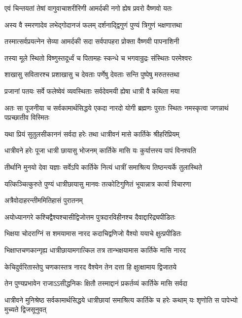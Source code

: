 \twolineshloka
{एवं चिन्तयतां तेषां वागुवाचाशरीरिणी}
{आमर्दकी नगो ह्येष प्रवरो वैष्णवो यतः} %

\twolineshloka
{अस्य वै स्मरणादेव लभेद्गोदानजं फलम्}
{दर्शनाद्द्विगुणं पुण्यं त्रिगुणं भक्षणात्तथा} %

\twolineshloka
{तस्मात्सर्वप्रयत्नेन सेव्या आमर्दकी सदा}
{सर्वपापहरा प्रोक्ता वैष्णवी पापनाशिनी} %

\twolineshloka
{तस्या मूले स्थितो विष्णुस्तदूर्ध्वं च पितामहः}
{स्कन्धे च भगवान्रुद्रः संस्थितः परमेश्वरः} %

\twolineshloka
{शाखासु सवितारश्च प्रशाखासु च देवताः}
{पर्णेषु देवताः सन्ति पुष्पेषु मरुतस्तथा} %

\twolineshloka
{प्रजानां पतयः सर्वे फलेष्वेवं व्यवस्थिताः}
{सर्वदेवमयी ह्येषा धात्री वै कथिता मया} %

\threelineshloka
{अतः सा पूजनीया च सर्वकामार्थसिद्धये}
{एकदा नारदो योगी ब्रह्मणः पुरतः स्थितः}
{नमस्कृत्वा जगन्नाथं पप्रच्छातीव विस्मितः} %


\twolineshloka
{यथा प्रियं सुतुलसीकाननं सर्वदा हरेः}
{तथा धात्रीवनं मासे कार्तिके श्रीहरिप्रियम्} %


\twolineshloka
{धात्रीवने हरेः पूजा धात्री छायासु भोजनम्}
{कार्तिके मासि यः कुर्यात्तस्य पापं विनश्यति} %

\twolineshloka
{तीर्थानि मुनयो देवा यज्ञाः सर्वेऽपि कार्तिके}
{नित्यं धात्रीं समाश्रित्य तिष्ठन्त्यर्के तुलास्थिते} %

\twolineshloka
{यत्किञ्चित्कुरुते पुण्यं धात्रीछायासु मानवः}
{तत्कोटिगुणितं भूयान्नात्र कार्या विचारणा} %


\onelineshloka
{अत्रैवोदाहरन्तीममितिहासं पुरातनम्} %

\twolineshloka
{अयोध्यानगरे कश्चिद्वैश्यश्चासीद्विजोत्तम}
{पुत्रदारविहीनश्च दैवाद्दारिद्र्यपीडितः} %

\twolineshloka
{भिक्षया चोदराग्निं स शमयामास नारद}
{कदाचिद्वणिजो वैश्यो ययाचे क्षुत्प्रपीडितः} %

\twolineshloka
{भिक्षाप्तचणकान्गृह्य धात्रीछायामगात्किल}
{तत्र तान्भक्षयामास कार्तिके मासि नारद} %

\twolineshloka
{केचिदुर्वरितास्तेपु चणकास्तत्र नारद}
{वैश्येन तेन दत्ता हि क्षुत्क्षामाय द्विजातये} %

\twolineshloka
{तेन पुण्यप्रभावेन राजाऽऽसीद्धनिकः क्षितौ}
{तस्माद्दानं प्रकर्तव्यं कार्तिके मासि सर्वदा} %

\threelineshloka
{धात्रीवने मुनिश्रेष्ठ सर्वकामार्थसिद्धये}
{धात्रीछायां समाश्रित्य कार्तिके च हरेः कथाम्}
{यः शृणोति स पापेभ्यो मुच्यते द्विजसूनुवत्} %

